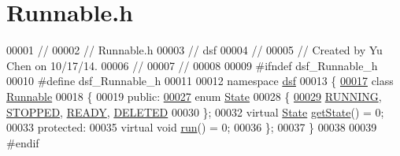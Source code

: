\hypertarget{_runnable_8h_source}{}\section{Runnable.\+h}
\label{_runnable_8h_source}

\begin{DoxyCode}
00001 \textcolor{comment}{//}
00002 \textcolor{comment}{//  Runnable.h}
00003 \textcolor{comment}{//  dsf}
00004 \textcolor{comment}{//}
00005 \textcolor{comment}{//  Created by Yu Chen on 10/17/14.}
00006 \textcolor{comment}{//}
00007 \textcolor{comment}{//}
00008 
00009 \textcolor{preprocessor}{#ifndef dsf\_Runnable\_h}
00010 \textcolor{preprocessor}{#define dsf\_Runnable\_h}
00011 
00012 \textcolor{keyword}{namespace }\hyperlink{namespacedsf}{dsf}
00013 \{
\hypertarget{_runnable_8h_source_l00017}{}\hyperlink{classdsf_1_1_runnable}{00017}     \textcolor{keyword}{class }\hyperlink{classdsf_1_1_runnable}{Runnable}
00018     \{
00019     \textcolor{keyword}{public}:
\hypertarget{_runnable_8h_source_l00027}{}\hyperlink{classdsf_1_1_runnable_a8eb63b21a0accc7a6a2a05f18e257991}{00027}         \textcolor{keyword}{enum} \hyperlink{classdsf_1_1_runnable_a8eb63b21a0accc7a6a2a05f18e257991}{State}
00028         \{
\hypertarget{_runnable_8h_source_l00029}{}\hyperlink{classdsf_1_1_runnable_a8eb63b21a0accc7a6a2a05f18e257991a0897925165e6577c4d3ebb185178c9c5}{00029}             \hyperlink{classdsf_1_1_runnable_a8eb63b21a0accc7a6a2a05f18e257991ad7167727fe5c31678c166aee6801ba0a}{RUNNING}, \hyperlink{classdsf_1_1_runnable_a8eb63b21a0accc7a6a2a05f18e257991a0897925165e6577c4d3ebb185178c9c5}{STOPPED}, \hyperlink{classdsf_1_1_runnable_a8eb63b21a0accc7a6a2a05f18e257991a60038f4f186bbe0d05fdbbe9da0f85de}{READY}, \hyperlink{classdsf_1_1_runnable_a8eb63b21a0accc7a6a2a05f18e257991aea5cfe327f95ca42d589e660b7cffe28}{DELETED}
00030         \};
00032         \textcolor{keyword}{virtual} \hyperlink{classdsf_1_1_runnable_a8eb63b21a0accc7a6a2a05f18e257991}{State} \hyperlink{classdsf_1_1_runnable_a139342b0d6d53fc7f1bbd97d99d3724a}{getState}() = 0;
00033     \textcolor{keyword}{protected}:
00035         \textcolor{keyword}{virtual} \textcolor{keywordtype}{void} \hyperlink{classdsf_1_1_runnable_a6e23b3b551a7cfdbff0e9ba2265d4378}{run}() = 0;
00036     \};
00037 \}
00038 
00039 \textcolor{preprocessor}{#endif}
\end{DoxyCode}

